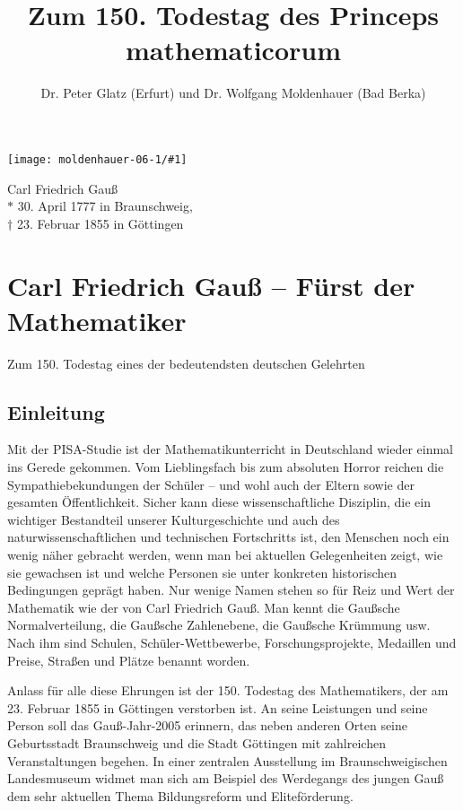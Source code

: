 \documentclass[10pt]{article}
\author{Dr. Peter Glatz (Erfurt) und Dr. Wolfgang Moldenhauer (Bad Berka)}
\title{Zum 150. Todestag des Princeps mathematicorum\kosemnetlicensemark}
\date{}
\newcommand{\Bild}[2]{
  \begin{center}
    \texttt{[image: moldenhauer-06-1/\#1]}
  \end{center}
}
\begin{document}
 
\maketitle 

\begin{minipage}{.4\textwidth}
  \Bild{gauss_bild.jpg}{.8}
\end{minipage}
\hfill
\parbox{6cm}{Carl Friedrich Gauß\footnotemark\\ $\ast$ 30. April 1777 in
  Braunschweig,\\ $\dag$ 23. Februar 1855 in Göttingen}


\tableofcontents
\clearpage

\section{Carl Friedrich Gauß -- Fürst der Mathematiker}

{\large Zum 150. Todestag eines der bedeutendsten deutschen Gelehrten}

\subsection{Einleitung}

Mit der PISA-Studie ist der Mathematikunterricht in Deutschland wieder einmal
ins Gerede gekommen. Vom Lieblingsfach bis zum {\glqq}absoluten Horror{\grqq}
reichen die Sympathiebekundungen der Schüler -- und wohl auch der Eltern sowie
der gesamten Öffentlichkeit. Sicher kann diese wissenschaftliche Disziplin,
die ein wichtiger Bestandteil unserer Kulturgeschichte und auch des
naturwissenschaftlichen und technischen Fortschritts ist, den Menschen noch
ein wenig näher gebracht werden, wenn man bei aktuellen Gelegenheiten zeigt,
wie sie gewachsen ist und welche Personen sie unter konkreten historischen
Bedingungen geprägt haben. Nur wenige Namen stehen so für Reiz und Wert der
Mathematik wie der von Carl Friedrich Gauß. Man kennt die Gaußsche
Normalverteilung, die Gaußsche Zahlenebene, die Gaußsche Krümmung usw. Nach
ihm sind Schulen, Schüler-Wettbewerbe, Forschungsprojekte, Medaillen und
Preise, Straßen und Plätze benannt worden.

Anlass für alle diese Ehrungen ist der 150. Todestag des Mathematikers, der am
23. Februar 1855 in Göttingen verstorben ist. An seine Leistungen und seine
Person soll das {\glqq}Gauß-Jahr-2005{\grqq} erinnern, das neben anderen Orten
seine Geburtsstadt Braunschweig und die Stadt Göttingen mit zahlreichen
Veranstaltungen begehen. In einer zentralen Ausstellung im Braunschweigischen
Landesmuseum widmet man sich am Beispiel des Werdegangs des jungen Gauß dem
sehr aktuellen Thema {\glqq}Bildungsreform und Eliteförderung{\grqq}.
\end{document}
